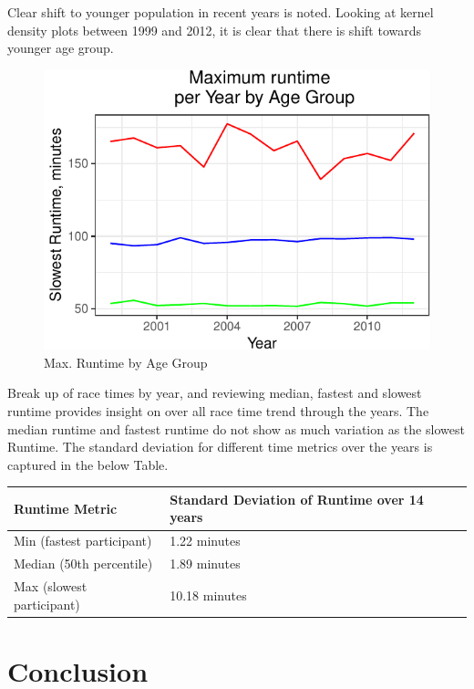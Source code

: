 \documentclass[
]{article}
\begin{document}
Clear shift to younger population in recent years is noted. Looking at
kernel density plots between 1999 and 2012, it is clear that there is
shift towards younger age group.

\begin{figure}[H]

{\centering \includegraphics{case_study02_files/figure-latex/unnamed-chunk-18-1} 

}

\caption{Max. Runtime by Age Group}\label{fig:unnamed-chunk-18}
\end{figure}

Break up of race times by year, and reviewing median, fastest and
slowest runtime provides insight on over all race time trend through the
years. The median runtime and fastest runtime do not show as much
variation as the slowest Runtime. The standard deviation for different
time metrics over the years is captured in the below Table.

\begin{longtable}[]{@{}ll@{}}
\toprule
Runtime Metric & Standard Deviation of Runtime over 14
years\tabularnewline
\midrule
\endhead
Min (fastest participant) & 1.22 minutes\tabularnewline
Median (50th percentile) & 1.89 minutes\tabularnewline
Max (slowest participant) & 10.18 minutes\tabularnewline
\bottomrule
\end{longtable}

\newpage

\hypertarget{conclusion}{%
\section{Conclusion}\label{conclusion}}
\end{document}
